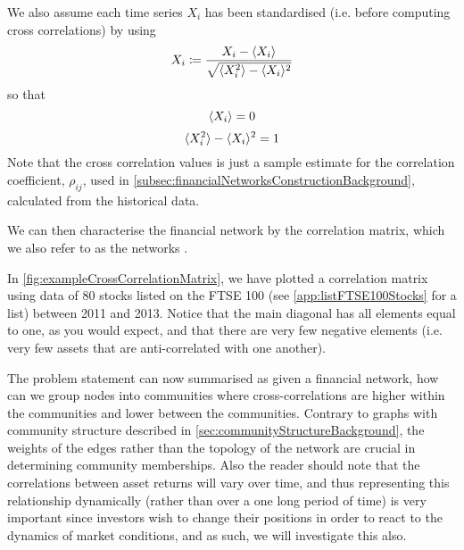 We also assume each time series $X_{i}$ has been standardised (i.e. before computing cross correlations) by using
\begin{equation}
	\label{eq:standardiseTimeSeries}
	X_{i} \coloneqq \frac{X_{i} - \langle X_{i}\rangle}{\sqrt{\langle X_{i}^{2}\rangle - \langle X_{i}\rangle^{2}}}
\end{equation}
so that
\begin{equation}
	\label{eq:zeroTemporalMean}
	\langle X_{i}\rangle = 0
\end{equation}
\begin{equation}
	\label{eq:unitTemporalVariance}
	\langle X_{i}^{2}\rangle - \langle X_{i}\rangle^{2} = 1
\end{equation}
Note that the cross correlation values is just a sample estimate for the correlation coefficient, $\rho_{ij}$, used in \cref{subsec:financialNetworksConstructionBackground}, calculated from the historical data.

We can then characterise the financial network by the correlation matrix, which we also refer to as the networks .

In \cref{fig:exampleCrossCorrelationMatrix}, we have plotted a correlation matrix using data of 80 stocks listed on the FTSE 100 (see \cref{app:listFTSE100Stocks} for a list) between 2011 and 2013. Notice that the main diagonal has all elements equal to one, as you would expect, and that there are very few negative elements (i.e. very few assets that are anti-correlated with one another).


The problem statement can now summarised as given a financial network, how can we group nodes into communities where cross-correlations are higher within the communities and lower between the communities.
Contrary to graphs with community structure described in \cref{sec:communityStructureBackground}, the weights of the edges rather than the topology of the network are crucial in determining community memberships.
Also the reader should note that the correlations between asset returns will vary over time, and thus representing this relationship dynamically (rather than over a one long period of time) is very important since investors wish to change their positions in order to react to the dynamics of market conditions, and as such, we will investigate this also.
